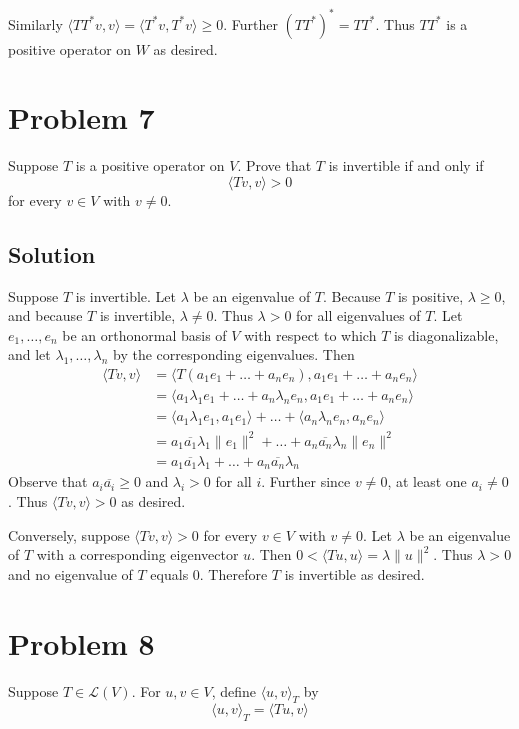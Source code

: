\documentclass{article}
\begin{document}
\vs

Similarly $\langle TT^*v,v\rangle=\langle T^*v,T^*v\rangle\geq 0$. Further $(TT^*)^*=TT^*$. Thus $TT^*$ is a positive operator on $W$ as desired.

\section*{Problem 7}
Suppose $T$ is a positive operator on $V$. Prove that $T$ is invertible if and only if
\[\langle Tv,v\rangle>0\]
for every $v\in V$ with $v\neq 0$.

\subsection*{Solution}
Suppose $T$ is invertible. Let $\lambda$ be an eigenvalue of $T$. Because $T$ is positive, $\lambda\geq0$, and because $T$ is invertible, $\lambda\neq 0$. Thus $\lambda>0$ for all eigenvalues of $T$. Let $e_1,\ldots,e_n$ be an orthonormal basis of $V$ with respect to which $T$ is diagonalizable, and let $\lambda_1,\ldots,\lambda_n$ by the corresponding eigenvalues. Then
\begin{align*}
    \langle Tv, v\rangle&=\langle T(a_1e_1+\ldots+a_n e_n), a_1e_1+\ldots+a_n e_n\rangle\\
    &=\langle a_1\lambda_1e_1+\ldots+a_n \lambda_n e_n, a_1e_1+\ldots+a_n e_n\rangle\\
    &=\langle a_1\lambda_1e_1, a_1e_1\rangle+\ldots+\langle a_n\lambda_n e_n, a_n e_n\rangle\\
    &=a_1\overline{a_1}\lambda_1\|e_1\|^2+\ldots+a_n\overline{a_n}\lambda_n\|e_n\|^2\\
    &=a_1\overline{a_1}\lambda_1+\ldots+a_n\overline{a_n}\lambda_n
\end{align*}
Observe that $a_i\overline{a_i}\geq0$ and $\lambda_i>0$ for all $i$. Further since $v\neq0$, at least one $a_i\neq 0$. Thus $\langle Tv, v\rangle>0$ as desired.

\vs

Conversely, suppose $\langle Tv,v\rangle>0$ for every $v\in V$ with $v\neq 0$. Let $\lambda$ be an eigenvalue of $T$ with a corresponding eigenvector $u$. Then $0<\langle Tu,u\rangle=\lambda\|u\|^2$. Thus $\lambda > 0$ and no eigenvalue of $T$ equals $0$. Therefore $T$ is invertible as desired.

\section*{Problem 8}
Suppose $T\in\mathcal{L}(V)$. For $u,v\in V$, define $\langle u,v\rangle_T$ by
\[\langle u,v\rangle_T=\langle Tu,v\rangle\]
\end{document}
